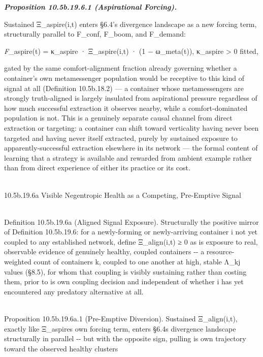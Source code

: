 \documentclass[
]{article}
\begin{document}
\emph{\textbf{Proposition 10.5b.19.6.1 (Aspirational Forcing).}}

Sustained Ξ\_aspire(i,t) enters §6.4's divergence landscape as a new
forcing term, structurally parallel to F\_conf, F\_boom, and F\_demand:

\emph{F}\_aspire(t) = κ\_aspire · Ξ\_aspire(i,t) · (1 − ω\_meta(t)),
κ\_aspire \textgreater{} 0 fitted,

gated by the same comfort-alignment fraction already governing whether a
container's own metamessenger population would be receptive to this kind
of signal at all (Definition 10.5b.18.2) --- a container whose
metamessengers are strongly truth-aligned is largely insulated from
aspirational pressure regardless of how much successful extraction it
observes nearby, while a comfort-dominated population is not. This is a
genuinely separate causal channel from direct extraction or targeting: a
container can shift toward verticality having never been targeted and
having never itself extracted, purely by sustained exposure to
apparently-successful extraction elsewhere in its network --- the formal
content of learning that a strategy is available and rewarded from
ambient example rather than from direct experience of either its
practice or its cost.\\
\strut \\
10.5b.19.6a Visible Negentropic Health as a Competing, Pre-Emptive
Signal\\
\strut \\
Definition 10.5b.19.6a (Aligned Signal Exposure). Structurally the
positive mirror of Definition 10.5b.19.6: for a newly-forming or
newly-arriving container i not yet coupled to any established network,
define Ξ\_align(i,t) ≥ 0 as i\textquotesingle s exposure to real,
observable evidence of genuinely healthy, coupled containers -\/- a
resource-weighted count of containers k, coupled to one another at high,
stable Λ\_kj values (§8.5), for whom that coupling is visibly sustaining
rather than costing them, prior to i\textquotesingle s own coupling
decision and independent of whether i has yet encountered any predatory
alternative at all.\\
\strut \\
Proposition 10.5b.19.6a.1 (Pre-Emptive Diversion). Sustained
Ξ\_align(i,t), exactly like Ξ\_aspire\textquotesingle s own forcing
term, enters §6.4\textquotesingle s divergence landscape structurally in
parallel -\/- but with the opposite sign, pulling i\textquotesingle s
own trajectory toward the observed healthy cluster\textquotesingle s
\end{document}

